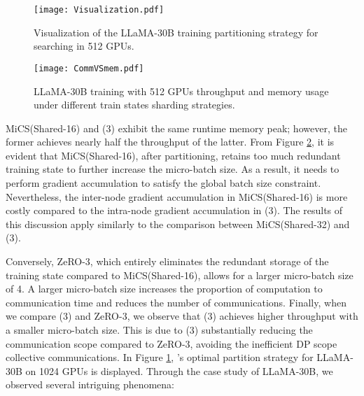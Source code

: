 
\begin{figure}[t]
    \centering
    \texttt{[image: Visualization.pdf]}
    \caption{Visualization of the LLaMA-30B training partitioning strategy for \SysName searching in 512 GPUs.}
    \label{Visualization}
\end{figure}

\begin{figure}[t]
    \centering
    \texttt{[image: CommVSmem.pdf]}
    \caption{LLaMA-30B training with 512 GPUs throughput and memory usage under different train states sharding strategies.}
    \label{CommVSmem}
\end{figure}

MiCS(Shared-16) and \SysName(3) exhibit the same runtime memory peak; however, the former achieves nearly half the throughput of the latter. From Figure \ref{CommVSmem}, it is evident that MiCS(Shared-16), after partitioning, retains too much redundant training state to further increase the micro-batch size. As a result, it needs to perform gradient accumulation to satisfy the global batch size constraint. Nevertheless, the inter-node gradient accumulation in MiCS(Shared-16) is more costly compared to the intra-node gradient accumulation in \SysName(3). The results of this discussion apply similarly to the comparison between MiCS(Shared-32) and \SysName(3).

Conversely, ZeRO-3, which entirely eliminates the redundant storage of the training state compared to MiCS(Shared-16), allows for a larger micro-batch size of 4. A larger micro-batch size increases the proportion of computation to communication time and reduces the number of communications. Finally, when we compare \SysName(3) and ZeRO-3, we observe that \SysName(3) achieves higher throughput with a smaller micro-batch size. This is due to \SysName(3) substantially reducing the communication scope compared to ZeRO-3, avoiding the inefficient DP scope collective communications. In Figure \ref{Visualization}, \SysName's optimal partition strategy for LLaMA-30B on 1024 GPUs is displayed. Through the case study of LLaMA-30B, we observed several intriguing phenomena:


